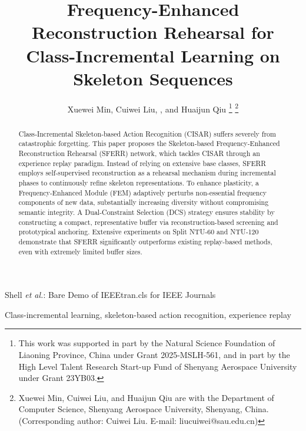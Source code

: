 \documentclass[journal]{IEEEtran}
\begin{document}
\title{Frequency-Enhanced Reconstruction Rehearsal for Class-Incremental Learning on Skeleton Sequences}

\author{Xuewei Min, Cuiwei Liu, , and Huaijun Qiu
\thanks{This work was supported in part by the Natural Science Foundation of Liaoning Province, China under Grant 2025-MSLH-561, and in part by the High Level Talent Research Start-up Fund of Shenyang Aerospace University under Grant 23YB03.}
\thanks{Xuewei Min, Cuiwei Liu, and Huaijun Qiu are with the Department of Computer Science, Shenyang Aerospace University, Shenyang, China. (Corresponding author: Cuiwei Liu. E-mail: liucuiwei@sau.edu.cn)}
}

{Shell \MakeLowercase{\textit{et al.}}: Bare Demo of IEEEtran.cls for IEEE Journals}
\maketitle

\begin{abstract}
Class‑Incremental Skeleton‑based Action Recognition (CISAR) suffers severely from catastrophic forgetting. 
This paper proposes the Skeleton‑based Frequency‑Enhanced Reconstruction Rehearsal (SFERR) network, which tackles CISAR through an experience replay paradigm. 
Instead of relying on extensive base classes, SFERR employs self‑supervised reconstruction as a rehearsal mechanism during incremental phases to continuously refine skeleton representations. 
To enhance plasticity, a Frequency‑Enhanced Module (FEM) adaptively perturbs non-essential frequency components of new data, substantially increasing diversity without compromising semantic integrity.
A Dual-Constraint Selection (DCS) strategy ensures stability by constructing a compact, representative buffer via reconstruction-based screening and prototypical anchoring.
Extensive experiments on Split NTU‑60 and NTU‑120 demonstrate that SFERR significantly outperforms existing replay-based methods, even with extremely limited buffer sizes.
\end{abstract}

\begin{IEEEkeywords} 
Class-incremental learning, skeleton-based action recognition, experience replay
\end{IEEEkeywords}


\IEEEpeerreviewmaketitle
\end{document}
